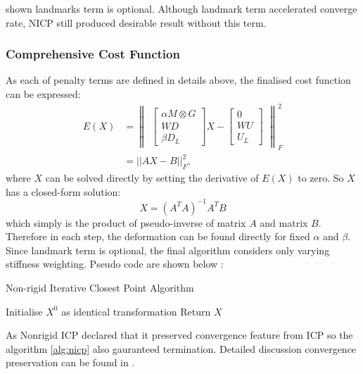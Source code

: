 \cite{Amberg2007} shown landmarks term is optional. Although landmark term accelerated converge rate, NICP still produced desirable result without this term.

\subsubsection{Comprehensive Cost Function}
As each of penalty terms are defined in details above, the finalised cost function can be expressed:
\begin{align}
\label{eq:nicpfinal}
E(X) &= 
\begin{Vmatrix}
    \begin{bmatrix}
        \alpha M \otimes G \\ WD \\ \beta D_L
    \end{bmatrix}
    X- 
    \begin{bmatrix}
        0 \\ WU \\ U_L
    \end{bmatrix}
\end{Vmatrix}
^2_F \\
&= ||AX-B||^2_F,
\end{align}
where $X$ can be solved directly by setting the derivative of $E(X)$ to zero. So $X$ has a closed-form solution:
\begin{equation}
\label{eq:nicpx}
X=(A^TA)^{-1}A^TB
\end{equation}
which simply is the product of pseudo-inverse of matrix $A$ and matrix $B$. Therefore in each step, the deformation can be found directly for fixed $\alpha$ and $\beta$. Since landmark term is optional, the final algorithm considers only varying stiffness weighting. Pseudo code are shown below \cite{Amberg2007}:
\begin{algorithm}[h]
\caption{Non-rigid Iterative Closest Point Algorithm}
\label{alg:nicp}
Initialise $X^0$ as identical transformation\;
Return $X$\;
\end{algorithm}

As Nonrigid ICP declared that it preserved convergence feature from ICP so the algorithm \ref{alg:nicp} also gauranteed termination. Detailed discussion convergence preservation can be found in \cite{Amberg2007}.